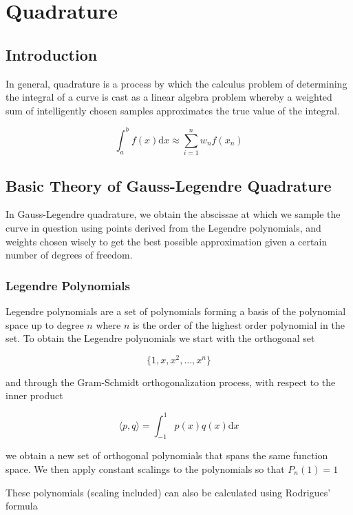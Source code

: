 
\chapter{Quadrature}
\label{ch:quadrature}



\section{Introduction}
\label{sec:introduction}

In general, quadrature is a process by which the calculus problem of determining the integral of a curve is cast as a linear algebra problem whereby a weighted sum of intelligently chosen samples approximates the true value of the integral.

\[ \int_{a}^{b} f(x) \mathrm{d}x \approx \sum_{i=1}^n w_n f(x_n) \]

\section{Basic Theory of Gauss-Legendre Quadrature}
In Gauss-Legendre quadrature, we obtain the abscissae at which we sample the curve in question using points derived from the Legendre polynomials, and weights chosen wisely to get the best possible approximation given a certain number of degrees of freedom.

\subsection{Legendre Polynomials}
Legendre polynomials are a set of polynomials forming a basis of the polynomial space up to degree $n$ where $n$ is the order of the highest order polynomial in the set. To obtain the Legendre polynomials we start with the orthogonal set

\[  \{ 1, x, x^2, \ldots , x^n \}  \]

and through the Gram-Schmidt orthogonalization process, with respect to the inner product

\[ \langle p,q \rangle = \int^1_{-1} p(x) q(x) \mathrm{d}x \]

we obtain a new set of orthogonal polynomials that spans the same function space. We then apply constant scalings to the polynomials so that \(P_n(1) = 1\)

These polynomials (scaling included) can also be calculated using Rodrigues' formula

